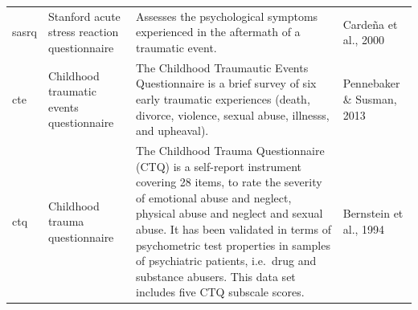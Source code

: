\documentclass[]{book}
\begin{document}
\begin{longtable}[]{@{}llll@{}}
\begin{minipage}[t]{0.22\columnwidth}
sasrq\strut
\end{minipage} & \begin{minipage}[t]{0.27\columnwidth}\raggedright
Stanford acute stress reaction questionnaire\strut
\end{minipage} & \begin{minipage}[t]{0.22\columnwidth}\raggedright
Assesses the psychological symptoms experienced in the aftermath of a traumatic event.\strut
\end{minipage} & \begin{minipage}[t]{0.18\columnwidth}\raggedright
Cardeña et al., 2000\strut
\end{minipage}\tabularnewline
\begin{minipage}[t]{0.22\columnwidth}\raggedright
cte\strut
\end{minipage} & \begin{minipage}[t]{0.27\columnwidth}\raggedright
Childhood traumatic events questionnaire\strut
\end{minipage} & \begin{minipage}[t]{0.22\columnwidth}\raggedright
The Childhood Traumautic Events Questionnaire is a brief survey of six early traumatic experiences (death, divorce, violence, sexual abuse, illnesss, and upheaval).\strut
\end{minipage} & \begin{minipage}[t]{0.18\columnwidth}\raggedright
Pennebaker \& Susman, 2013\strut
\end{minipage}\tabularnewline
\begin{minipage}[t]{0.22\columnwidth}\raggedright
ctq\strut
\end{minipage} & \begin{minipage}[t]{0.27\columnwidth}\raggedright
Childhood trauma questionnaire\strut
\end{minipage} & \begin{minipage}[t]{0.22\columnwidth}\raggedright
The Childhood Trauma Questionnaire (CTQ) is a self-report instrument covering 28 items, to rate the severity of emotional abuse and neglect, physical abuse and neglect and sexual abuse. It has been validated in terms of psychometric test properties in samples of psychiatric patients, i.e.~drug and substance abusers. This data set includes five CTQ subscale scores.\strut
\end{minipage} & \begin{minipage}[t]{0.18\columnwidth}\raggedright
Bernstein et al., 1994\strut
\end{minipage}\tabularnewline

\end{longtable}
\end{document}
